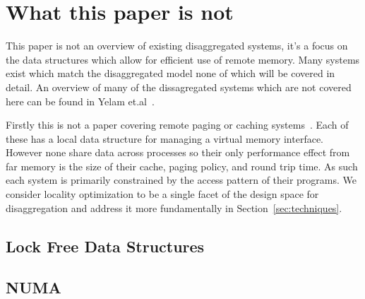 \section{What this paper is not}

This paper is not an overview of existing disaggregated systems, it's a focus on
the data structures which allow for efficient use of remote memory. Many systems
exist which match the disaggregated model none of which will be covered in
detail. An overview of many of the dissagregated systems which are not covered
here can be found in Yelam et.al~\cite{how-to-build}.

Firstly this is not a paper covering remote paging or caching
systems~\cite{fastswap,kona,infiniswap,leap,legoos}. Each of these has a local
data structure for managing a virtual memory interface.  However none share data
across processes so their only performance effect from far memory is the size of
their cache, paging policy, and round trip time. As such each system is
primarily constrained by the access pattern of their programs. We consider
locality optimization to be a single facet of the design space for
disaggregation and address it more fundamentally in
Section~\ref{sec:techniques}.



\subsection{Lock Free Data Structures}


\subsection{NUMA}


